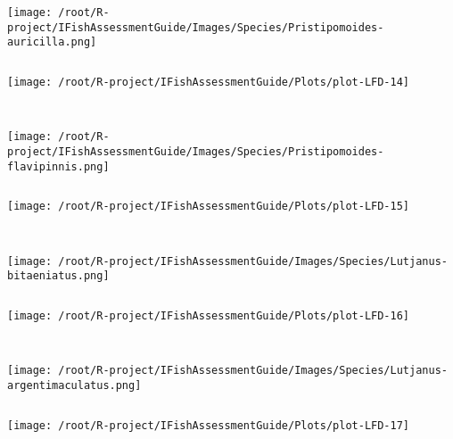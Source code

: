 \begin{knitrout}
\begin{kframe}
\begin{verbatim}
\end{verbatim}
\end{kframe}
\texttt{[image: /root/R-project/IFishAssessmentGuide/Images/Species/Pristipomoides-auricilla.png]}
\begin{kframe}\begin{verbatim}
\end{verbatim}
\end{kframe}
\texttt{[image: /root/R-project/IFishAssessmentGuide/Plots/plot-LFD-14]} 
\begin{kframe}\begin{verbatim}
 
\end{verbatim}
\end{kframe}
\texttt{[image: /root/R-project/IFishAssessmentGuide/Images/Species/Pristipomoides-flavipinnis.png]}
\begin{kframe}\begin{verbatim}
\end{verbatim}
\end{kframe}
\texttt{[image: /root/R-project/IFishAssessmentGuide/Plots/plot-LFD-15]} 
\begin{kframe}\begin{verbatim}
 
\end{verbatim}
\end{kframe}
\texttt{[image: /root/R-project/IFishAssessmentGuide/Images/Species/Lutjanus-bitaeniatus.png]}
\begin{kframe}\begin{verbatim}
\end{verbatim}
\end{kframe}
\texttt{[image: /root/R-project/IFishAssessmentGuide/Plots/plot-LFD-16]} 
\begin{kframe}\begin{verbatim}
 
\end{verbatim}
\end{kframe}
\texttt{[image: /root/R-project/IFishAssessmentGuide/Images/Species/Lutjanus-argentimaculatus.png]}
\begin{kframe}\begin{verbatim}
\end{verbatim}
\end{kframe}
\texttt{[image: /root/R-project/IFishAssessmentGuide/Plots/plot-LFD-17]} 
\begin{kframe}\begin{verbatim}
 

\end{verbatim}
\end{kframe}
\end{knitrout}
